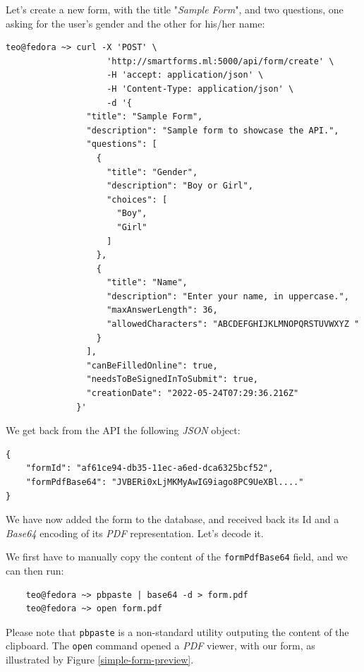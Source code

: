 \documentclass[11pt, a4paper]{report}
\def\code#1{\texttt{#1}}
\begin{document}
Let's create a new form, with the title "\textit{Sample Form}", and two questions, one asking for the user's gender and the other for his/her name:

\begin{verbatim}
teo@fedora ~> curl -X 'POST' \
                    'http://smartforms.ml:5000/api/form/create' \
                    -H 'accept: application/json' \
                    -H 'Content-Type: application/json' \
                    -d '{
                "title": "Sample Form",
                "description": "Sample form to showcase the API.",
                "questions": [
                  {
                    "title": "Gender",
                    "description": "Boy or Girl",
                    "choices": [
                      "Boy",
                      "Girl"
                    ]
                  },
                  {
                    "title": "Name",
                    "description": "Enter your name, in uppercase.",
                    "maxAnswerLength": 36,
                    "allowedCharacters": "ABCDEFGHIJKLMNOPQRSTUVWXYZ "
                  }
                ],
                "canBeFilledOnline": true,
                "needsToBeSignedInToSubmit": true,
                "creationDate": "2022-05-24T07:29:36.216Z"
              }'
\end{verbatim}

We get back from the API the following \textit{JSON} object:
\begin{verbatim}
{
    "formId": "af61ce94-db35-11ec-a6ed-dca6325bcf52",
    "formPdfBase64": "JVBERi0xLjMKMyAwIG9iago8PC9UeXBl...."
}
\end{verbatim}

We have now added the form to the database, and received back its Id and a \textit{Base64} encoding of its \textit{PDF} representation. Let's decode it.

We first have to manually copy the content of the \code{formPdfBase64} field, and we can then run:

\definecolor{bg}{rgb}{0.95,0.95,0.95}
\begin{verbatim}
    teo@fedora ~> pbpaste | base64 -d > form.pdf
    teo@fedora ~> open form.pdf
\end{verbatim}

Please note that \code{pbpaste} is a non-standard utility outputing the content of the clipboard. The \code{open} command opened a \textit{PDF} viewer, with our form, as illustrated by Figure \ref{simple-form-preview}.
\end{document}
